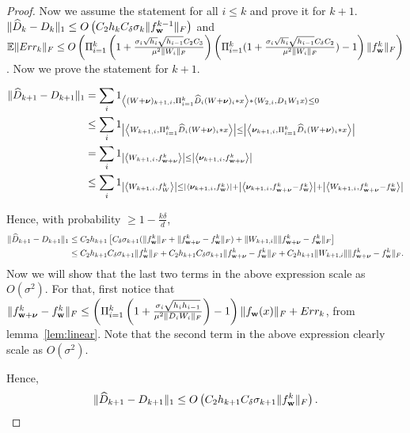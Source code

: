 \documentclass{article}
\begin{document}
\begin{proof}

Now we assume the statement for all $i \leq k$ and prove it for $k+1$.
$\|\widehat{D}_{k} -D_{k}\|_1 \leq O \left( C_2 h_k  C_{\delta} \sigma_k  \|f^{k-1}_{\mathbf{w}}\|_F \right) $ and $\mathbb{E}\| Err_k\|_F \leq   O \left( \Pi_{i=1}^k \left( 1+\frac{\sigma_i\sqrt{h_i}\sqrt{h_{i-1}} C_2 C_3 }{\mu^2 \|W_i\|_F  }\right)\left(\Pi_{i=1}^k (1+ \frac{\sigma_i\sqrt{h_i}\sqrt{h_{i-1}} C_{\delta} C_2}{\mu^2 \|W_i\|_F } ) - 1\right)\|f^k_{\mathbf{w}}\|_F \right)$. Now we prove the statement for $k+1$.
 
\begin{align*}
\|\widehat{D}_{k+1} - D_{k+1}\|_1 &= \sum_i 1_{\left\langle (W+\boldsymbol{\nu})_{k+1 , i},  \Pi_{i=1}^{k } \widehat{D}_i (W+\boldsymbol{\nu})_i *x  \right\rangle *\left\langle W_{2,i}, D_1 W_1 x  \right\rangle \leq 0} \\
&\leq \sum_i 1_{ \left\lvert{ \left\langle W_{k+1 , i},  \Pi_{i=1}^{k } \widehat{D}_i (W+\boldsymbol{\nu})_i *x  \right\rangle}\right\rvert \leq \left\lvert{ \left\langle \boldsymbol{\nu}_{k+1 , i},  \Pi_{i=1}^{k } \widehat{D}_i (W+\boldsymbol{\nu})_i *x  \right\rangle}\right\rvert } \\
&=  \sum_i 1_{ \left\lvert{ \left\langle W_{k+1 , i},  f^k_{\mathbf{w}+\boldsymbol{\nu}}  \right\rangle}\right\rvert \leq \left\lvert{ \left\langle \boldsymbol{\nu}_{k+1 , i},  f^k_{\mathbf{w}+\boldsymbol{\nu}}  \right\rangle}\right\rvert} \\
&\leq   \sum_i 1_{ \left\lvert{ \left\langle W_{k+1 , i},  f^k_{W}  \right\rangle}\right\rvert \leq \left\lvert{ \left\langle \boldsymbol{\nu}_{k+1 , i},  f^k_{\mathbf{w}}  \right\rangle}\right\rvert + \left\lvert{ \left\langle \boldsymbol{\nu}_{k+1 , i},  f^k_{\mathbf{w}+\boldsymbol{\nu}} -f^k_{\mathbf{w}}\right\rangle}\right\rvert + \left\lvert{ \left\langle W_{k+1 , i},  f^k_{\mathbf{w}+\boldsymbol{\nu}} -f^k_{\mathbf{w}}  \right\rangle}\right\rvert } 
\end{align*}

Hence, with  probability $\geq 1-\frac{k\delta}{d}$, 
\begin{align*}
\|\widehat{D}_{k+1} - D_{k+1}\|_1 &\leq  C_2 h_{k+1} \left[ C_{\delta} \sigma_{k+1} ( \|f^k_{\mathbf{w}} \|_F +\|f^k_{\mathbf{w}+\boldsymbol{\nu}} -f^k_{\mathbf{w}} \|_F ) + \| W_{k+1, i}\|  \|f^k_{\mathbf{w}+\boldsymbol{\nu}} -f^k_{\mathbf{w}} \|_F \right] \\
&\leq C_2 h_{k+1}C_{\delta} \sigma_{k+1} \|f^k_{\mathbf{w}} \|_F +C_2 h_{k+1}C_{\delta} \sigma_{k+1}\|f^k_{\mathbf{w}+\boldsymbol{\nu}} -f^k_{\mathbf{w}} \|_F  +C_2 h_{k+1} \| W_{k+1, i}\|  \|f^k_{\mathbf{w}+\boldsymbol{\nu}} -f^k_{\mathbf{w}} \|_F . 
\end{align*}
Now we will show that the last two terms in the above expression scale as $O(\sigma^2)$. For that, first notice that $\|f^k_{\mathbf{w}+\boldsymbol{\nu}} -f^k_{\mathbf{w}} \|_F \leq  \left(\Pi_{i=1}^k \left(1+ \frac{\sigma_i \sqrt{h_i h_{i-1}}}{\mu^2 \|D_i W_i\|_F} \right) -1 \right)  \|f_{\mathbf{w}}(x)\|_F + Err_k$, from lemma~\ref{lem:linear}. Note that the second term in the above expression clearly scale as $O(\sigma^2)$.

Hence,
\begin{align*}
\|\widehat{D}_{k+1} - D_{k+1}\|_1 \leq O \left( C_2 h_{k+1}C_{\delta} \sigma_{k+1} \|f^k_{\mathbf{w}} \|_F \right).
\end{align*}


\end{proof}
\end{document}
